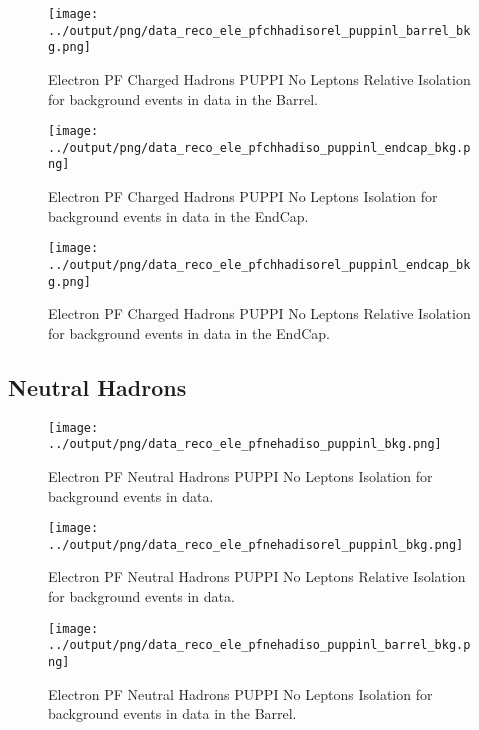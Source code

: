 \documentclass[11pt]{book}
\begin{document}
\begin{figure}[htb]
\centering
\texttt{[image: ../output/png/data\_reco\_ele\_pfchhadisorel\_puppinl\_barrel\_bkg.png]}
\caption{Electron PF Charged Hadrons PUPPI No Leptons Relative Isolation for background events in data in the Barrel.}
\label{fig:data_ele_pfchhadisorel_puppinl_barrel_bkg}
\end{figure}

\begin{figure}[htb]
\centering
\texttt{[image: ../output/png/data\_reco\_ele\_pfchhadiso\_puppinl\_endcap\_bkg.png]}
\caption{Electron PF Charged Hadrons PUPPI No Leptons Isolation for background events in data in the EndCap.}
\label{fig:data_ele_pfchhadiso_puppinl_endcap_bkg}
\end{figure}

\begin{figure}[htb]
\centering
\texttt{[image: ../output/png/data\_reco\_ele\_pfchhadisorel\_puppinl\_endcap\_bkg.png]}
\caption{Electron PF Charged Hadrons PUPPI No Leptons Relative Isolation for background events in data in the EndCap.}
\label{fig:data_ele_pfchhadisorel_puppinl_endcap_bkg}
\end{figure}
\clearpage

\subsection{Neutral Hadrons}
\begin{figure}[htb]
\centering
\texttt{[image: ../output/png/data\_reco\_ele\_pfnehadiso\_puppinl\_bkg.png]}
\caption{Electron PF Neutral Hadrons PUPPI No Leptons Isolation for background events in data.}
\label{fig:data_ele_pfnehadiso_puppinl_bkg}
\end{figure}

\begin{figure}[htb]
\centering
\texttt{[image: ../output/png/data\_reco\_ele\_pfnehadisorel\_puppinl\_bkg.png]}
\caption{Electron PF Neutral Hadrons PUPPI No Leptons Relative Isolation for background events in data.}
\label{fig:data_ele_pfnehadisorel_puppinl_bkg}
\end{figure}

\begin{figure}[htb]
\centering
\texttt{[image: ../output/png/data\_reco\_ele\_pfnehadiso\_puppinl\_barrel\_bkg.png]}
\caption{Electron PF Neutral Hadrons PUPPI No Leptons Isolation for background events in data in the Barrel.}
\label{fig:data_ele_pfnehadiso_puppinl_barrel_bkg}
\end{figure}
\end{document}
